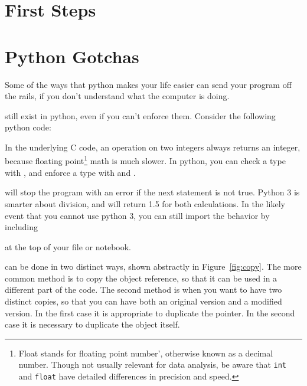 \documentclass[justified, nobib]{tufte-handout}
\newcommand{\floatNote}{\footnote{ Float stands for floating
  point number', otherwise known as a decimal number. Though not usually
  relevant for data analysis, be aware that \texttt{int} and \texttt{float}
  have detailed differences in precision and speed.}}
\begin{document}
\pagebreak



\section*{First Steps}

\section*{Python Gotchas}
Some of the ways that python makes your life easier can send your program off
the rails, if you don't understand what the computer is doing.

 still exist in python, even if you can't enforce
them. Consider the following python code:
\begin{adjustwidth}{2.5em}{0pt}
\end{adjustwidth}

\noindent
In the underlying C code, an operation on two integers always returns an
integer, because floating point\floatNote{} \;math is much slower. In python,
you can check a type with , and enforce a
type with  and .
\begin{adjustwidth}{2.5em}{0pt}
\end{adjustwidth}
 will stop the program with an error if the next statement is
not true. Python 3 is smarter about division, and will return 1.5 for both
calculations. In the likely event that you cannot use python 3, you can still
import the behavior by including
\begin{adjustwidth}{2.5em}{0pt}
\end{adjustwidth}
at the top of your file or notebook.

 can be done in two distinct ways, shown abstractly
in Figure~\ref*{fig:copy}. The more common method is to copy the object
reference, so that it can be used in a different part of the code. The second
method is when you want to have two distinct copies, so that you can have both
an original version and a modified version. In the first case it is appropriate
to duplicate the pointer. In the second case it is necessary to duplicate the
object itself.
\end{document}
